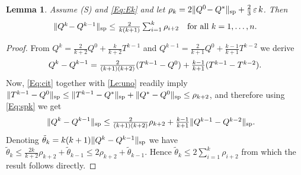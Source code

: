 \documentclass{article}
\renewcommand{\sp}[1]{\|{#1}\|_\text{\rm sp}}
\theoremstyle{plain}
\newtheorem{lemma}[theorem]{Lemma}
\theoremstyle{definition}
\theoremstyle{remark}
\begin{document}
\vspace{2ex}

\begin{lemma}\label{Le:dos} Assume \mbox{\sc (S)} and \eqref{Eq:Ek} and let $\rho_k=2\sp{Q^0\!-Q^*}+\frac{2}{3}\,\varepsilon\,k$. Then 
$$\mbox{$\sp{Q^{k}\!-Q^{k-1}} \le \frac{2}{k(k+1)}\sum_{i=1}^{k}\rho_{i+2}\quad \text{for all} \,\, k=1,\ldots,n.$}$$ 
\end{lemma}
\begin{proof} From 
$Q^{k}=\frac{2}{k+2}Q^0+\frac{k}{k+2}T^{k-1}$ and
$Q^{k-1}=\frac{2}{k+1}Q^0+\frac{k-1}{k+1}T^{k-2}$
we derive
\begin{equation} \label{eq:aux}
    Q^{k}-Q^{k-1}
    =\mbox{$ \frac{2}{(k+1)(k+2)}(T^{k-1}-Q^0) + \frac{k-1}{k+1}(T^{k-1}-T^{k-2})$}.
\end{equation}
Now, \eqref{Eq:cit} together with \cref{Le:uno}  readily imply $\sp{T^{k-1}-Q^0}\leq \sp{T^{k-1}-Q^*} +\sp{Q^*-Q^0}\leq\rho_{k+2}$,  
and therefore using \eqref{Eq:spk} we get
\begin{align*}
    \sp{Q^{k}-Q^{k-1}} 
    &\le \mbox{$\frac{2}{(k+1)(k+2)}\rho_{k+2} +  \frac{k-1}{k+1}\sp{Q^{k-1}- Q^{k-2}}$}.
\end{align*}
Denoting $\tilde \theta_k=k(k+1)\sp{Q^k-Q^{k-1}}$ we have
$\tilde\theta_k\leq \frac{2k}{k+2}\rho_{k+2}+\tilde\theta_{k-1}\leq 2\rho_{k+2}+\tilde\theta_{k-1}$.
Hence $\tilde\theta_k\leq2\sum_{i=1}^k\rho_{i+2}$ from which the result follows directly.
\end{proof}
\end{document}
